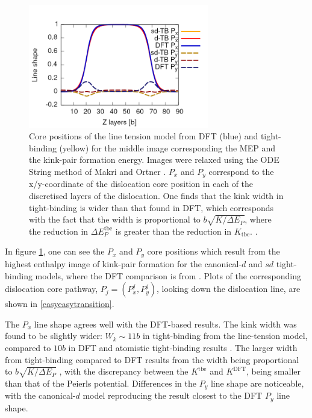 \documentclass[a4paper,11pt]{article}
\numberwithin{equation}{chapter}
\numberwithin{listing}{chapter}
\begin{document}
\begin{figure}[htbp]
\centering
\includegraphics[width=0.7\textwidth]{iron/Images/lineshape-all_correct_gradient.png}
\caption{Core positions of the line tension model from DFT (blue) and tight-binding (yellow) for the middle image corresponding the MEP and the kink-pair formation energy. Images were relaxed using the ODE String method of Makri and Ortner \cite{Makri2019}. \(P_x\) and \(P_y\) correspond to the x/y-coordinate of the dislocation core position in each of the discretised layers of the dislocation. One finds that the kink width in tight-binding is wider than that found in DFT, which corresponds with the fact that the width is proportional to \(b\sqrt{K/\Delta E_P}\), where the reduction in \(\Delta E_P^{\text{tbe}}\) is greater than the reduction in \(K_{\text{tbe}}\).   \label{lineshape}.}
\end{figure}



In figure \ref{lineshape}, one can see the \(P_x\) and \(P_y\) core positions which
result from the highest enthalpy image of kink-pair formation for the
canonical-\(d\) and \(sd\) tight-binding models, where the DFT comparison is from
\cite{Itakura2012}. Plots of the corresponding dislocation core pathway, \(P_j =
    (P^j_x, P^j_y)\), looking down the dislocation line, are shown in
\ref{easyeasytransition}.

The \(P_x\) line shape agrees well with the DFT-based results. The kink width
was found to be slightly wider: \(W_k \sim 11b\) in tight-binding from the
line-tension model, compared to \(10b\) in DFT and atomistic tight-binding
results \cite{Simpson2019}. The larger width from tight-binding compared to
DFT results from the width being proportional to \(b\sqrt{K/\Delta E_P}\)
\cite{Itakura2012}, with the discrepancy between the \(K^{\text{tbe} }\) and
\(K^{\text{DFT} }\), being smaller than that of the Peierls
potential. Differences in the \(P_y\) line shape are noticeable, with the
canonical-\(d\) model reproducing the result closest to the DFT \(P_y\) line
shape.
\end{document}
